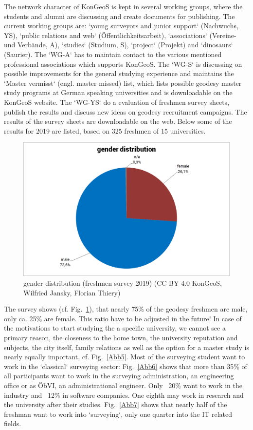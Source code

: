 \documentclass[a4paper]{article}
\begin{document}
The network character of KonGeoS is kept in several working groups, where the students and alumni are discussing and create documents for publishing. The current working groups are: `young surveyors and junior support` (Nachwuchs, YS), `public relations and web` ({\"O}ffentlichkeitsarbeit), `associations` (Vereine- und Verb{\"a}nde, A), `studies` (Studium, S), `project` (Projekt) and `dinosaurs` (Saurier). The `WG-A` has to maintain contact to the various mentioned professional associations which supports KonGeoS. The `WG-S` is discussing on possible improvements for the general studying experience and maintains the `Master vermisst` (engl. master missed) list, which lists possible geodesy master study programs at German speaking universities and is downloadable on the KonGeoS website. The `WG-YS` do a evaluation of freshmen survey sheets, publish the results and discuss new ideas on geodesy recruitment campaigns. The results of the survey sheets are downloadable on the web. Below some of the results for 2019 are listed, based on 325 freshmen of 15 universities.

\begin{figure}[!h]
\begin{center}
\includegraphics[width=12cm]{wg-ys1.png}
\caption{gender distribution (freshmen survey 2019) (CC BY 4.0 KonGeoS, Wilfried Jansky, Florian Thiery)}
\label{Abb4}
\end{center}
\end{figure}

The survey shows (cf. Fig.~\ref{Abb4}), that nearly 75\% of the geodesy freshmen are male, only ca. 25\% are female. This ratio have to be adjusted in the future! In case of the motivations to start studying the a specific university, we cannot see a primary reason, the closeness to the home town, the university reputation and subjects, the city itself, family relations as well as the option for a master study is nearly equally important, cf. Fig.~\ref{Abb5}. Most of the surveying student want to work in the `classical` surveying sector: Fig.~\ref{Abb6} shows that more than 35\% of all participants want to work in the surveying administration, an engineering office or as {\"O}bVI, an administrational engineer. Only ~20\% want to work in the industry and ~12\% in software companies. One eighth may work in research and the university after their studies. Fig.~\ref{Abb7} shows that nearly half of the freshman want to work into `surveying`, only one quarter into the IT related fields.
\end{document}
